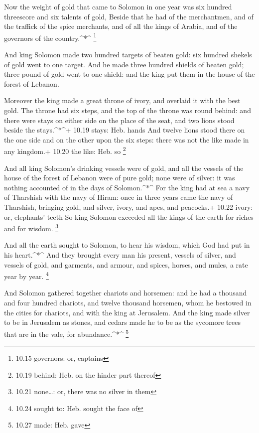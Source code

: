  Now the weight of gold that came to Solomon in one year
was six hundred threescore and six talents of gold,  Beside
that he had of the merchantmen, and of the traffick of the spice
merchants, and of all the kings of Arabia, and of the governors of the
country.\^{}*\^{} \footnote{10.15 governors: or, captains}

 And king Solomon made two hundred targets of beaten gold:
six hundred shekels of gold went to one target.  And he
made three hundred shields of beaten gold; three pound of gold went to
one shield: and the king put them in the house of the forest of Lebanon.

 Moreover the king made a great throne of ivory, and
overlaid it with the best gold.  The throne had six steps,
and the top of the throne was round behind: and there were stays on
either side on the place of the seat, and two lions stood beside the
stays.\^{}*\^{}+ 10.19 stays: Heb. hands  And twelve lions
stood there on the one side and on the other upon the six steps: there
was not the like made in any kingdom.+ 10.20 the like: Heb. so
\footnote{10.19 behind: Heb. on the hinder part thereof}

 And all king Solomon's drinking vessels were of gold, and
all the vessels of the house of the forest of Lebanon were of pure gold;
none were of silver: it was nothing accounted of in the days of
Solomon.\^{}*\^{}  For the king had at sea a navy of
Tharshish with the navy of Hiram: once in three years came the navy of
Tharshish, bringing gold, and silver, ivory, and apes, and peacocks.+
10.22 ivory: or, elephants' teeth  So king Solomon exceeded
all the kings of the earth for riches and for wisdom. \footnote{10.21
  none\ldots: or, there was no silver in them}

 And all the earth sought to Solomon, to hear his wisdom,
which God had put in his heart.\^{}*\^{}  And they brought
every man his present, vessels of silver, and vessels of gold, and
garments, and armour, and spices, horses, and mules, a rate year by
year. \footnote{10.24 sought to: Heb. sought the face of}

 And Solomon gathered together chariots and horsemen: and
he had a thousand and four hundred chariots, and twelve thousand
horsemen, whom he bestowed in the cities for chariots, and with the king
at Jerusalem.  And the king made silver to be in Jerusalem
as stones, and cedars made he to be as the sycomore trees that are in
the vale, for abundance.\^{}*\^{} \footnote{10.27 made: Heb. gave}

